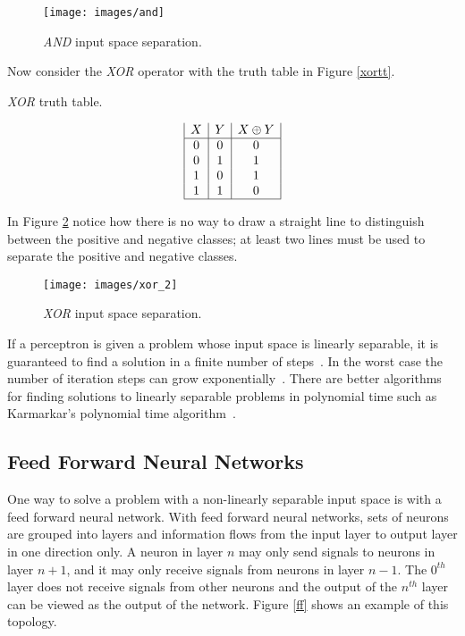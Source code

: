 \begin{figure}[htb!]
  \centering
  \texttt{[image: images/and]}
  \caption{{\it AND} input space separation.}
  \label{ands}
\end{figure}

Now consider the {\it XOR} operator with the truth table in Figure
\ref{xortt}.

\begin{table}[h!]
\caption{{\it XOR} truth table.}
\label{xortt}
\begin{displaymath}
\begin{array}{|c|c|c|}
   X
 & Y
 & X \oplus Y
\\
\hline
0 & 0 & 0\\
0 & 1 & 1\\
1 & 0 & 1\\
1 & 1 & 0\\
\hline
\end{array}
\end{displaymath}
\end{table}

In Figure \ref{xorss} notice how there is no way to draw a straight
line to distinguish between the positive and negative classes; at least two lines must be used to separate the positive and negative classes.

\begin{figure}[htb!]
  \centering
  \texttt{[image: images/xor\_2]}
  \caption{{\it XOR} input space separation.}
  \label{xorss}
\end{figure}

If a perceptron is given a problem whose input space is linearly
separable, it is guaranteed to find a solution in a finite number of
steps~\cite{patternRecognition1}. 
In the worst case the number of iteration steps can grow
exponentially~\cite[95-96]{rojas}.
There are better algorithms for finding solutions to linearly separable problems in
polynomial time such as Karmarkar's polynomial time
algorithm~\cite{karmarkar}.

\subsection{Feed Forward Neural Networks} 
One way to solve a problem with a non-linearly separable input space
is with a feed forward neural network.
With feed forward neural networks, sets of neurons are grouped into
layers and information flows from the input layer to output layer in one direction only.
A neuron in layer $n$ may only send signals to neurons in layer $n+1$, and it may only receive signals from neurons in layer $n-1$.
The $0^{th}$ layer does not receive signals from other neurons and the output of the $n^{th}$ layer can be viewed as the output of the network.
Figure \ref{ff} shows an example of this topology.

